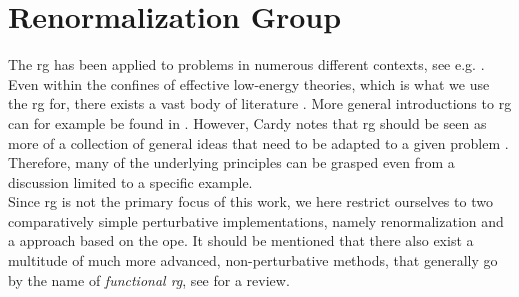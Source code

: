 \section{Renormalization Group}\label{chap:rg}
The \gls{rg} has been applied to problems in numerous different contexts, see e.g. \cite[]{RG_Theory_Fisher_1998}.
Even within the confines of effective low-energy theories, which is what we use the \gls{rg} for, there exists a vast body of literature \cite{RG_SG_Wilson_Sharp_vs_Smooth_Kogut_1979,RG_NonPerturbative_Introduction_Delamotte_2012,RG_EFT_lowDim_Yanagisawa_2017}.
More general introductions to \gls{rg} can for example be found in \cite{Cardy_1996,RG_Theory_Fisher_1998}.
However, Cardy notes that \gls{rg} should be seen as more of a collection of general ideas that need to be adapted to a given problem \cite[p.28]{Cardy_1996}.
Therefore, many of the underlying principles can be grasped even from a discussion limited to a specific example.\\
Since \gls{rg} is not the primary focus of this work, we here restrict ourselves to two comparatively simple perturbative implementations, namely \tms{} renormalization and a \trspace{} approach based on the \acrlong{ope}.
It should be mentioned that there also exist a multitude of much more advanced, non-perturbative methods, that generally go by the name of \emph{functional \gls{rg}}, see \cite{RG_Wilson_fRG_review_Dupuis_2021} for a review.
